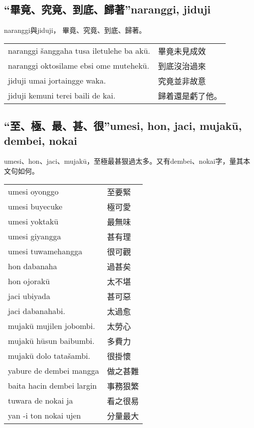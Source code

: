 \documentclass{article}
\begin{document}
\subsection{“畢竟、究竟、到底、歸著”naranggi, jiduji}
\noindent naranggi與jiduji， 畢竟、究竟、到底、歸著。
\begin{center}
    \begin{tabularx}{\textwidth}{XX}
        naranggi \v{s}anggaha tusa iletulehe ba ak\={u}. &畢竟未見成效\\
        naranggi oktosilame ebsi ome mutehek\={u}. &到底沒治過來\\
        jiduji umai jortaingge waka.&究竟並非故意\\
        jiduji kemuni terei baili de kai. & 歸着還是虧了他。
    \end{tabularx}
\end{center}


\subsection{“至、極、最、甚、很”umesi, hon, jaci, mujak\={u}, dembei, nokai}
\noindent umesi、hon、jaci、mujak\={u}，至極最甚狠過太多。又有dembei、nokai字，量其本文句如何。
\begin{center}
    \begin{tabularx}{\textwidth}{XX}
        umesi oyonggo & 至要緊\\
        umesi buyecuke & 極可愛\\
        umesi yoktak\={u} & 最無味\\
        umesi giyangga & 甚有理\\
        umesi tuwamehangga & 很可觀\\
        hon dabanaha & 過甚矣\\
        hon ojorak\={u} & 太不堪\\
        jaci ubiyada & 甚可惡\\
        jaci dabanahabi. & 太過愈\\
        mujak\={u} mujilen jobombi. & 太勞心\\
        mujak\={u} h\={u}sun baibumbi. & 多費力\\
        mujak\={u} dolo tata\v{s}ambi. & 很掛懷\\
        yabure de dembei mangga & 做之甚難\\
        baita hacin dembei largin & 事務狠繁\\
        tuwara de nokai ja & 看之很易\\
        yan -i ton nokai ujen & 分量最大
    \end{tabularx}
\end{center}
\end{document}
